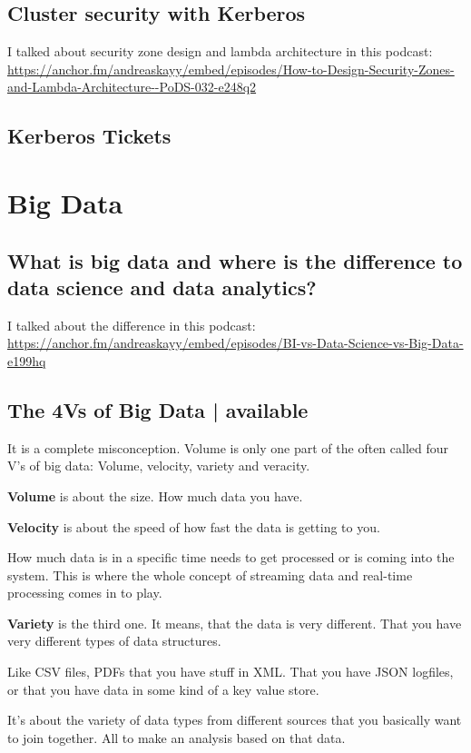 \documentclass[12pt, numbers=noenddot]{scrreprt} %
\begin{document}
\section{Cluster security with Kerberos}

I talked about security zone design and lambda architecture in this podcast: \url{https://anchor.fm/andreaskayy/embed/episodes/How-to-Design-Security-Zones-and-Lambda-Architecture--PoDS-032-e248q2}

\section{Kerberos Tickets}


\chapter{Big Data}
\section{What is big data and where is the difference to data science and data analytics?}
I talked about the difference in this podcast: \url{https://anchor.fm/andreaskayy/embed/episodes/BI-vs-Data-Science-vs-Big-Data-e199hq}

\section{The 4Vs of Big Data | available}

It is a complete misconception. Volume is only one part of the often called four V’s of big data: Volume, velocity, variety and veracity.

\textbf{Volume} is about the size. How much data you have.

\textbf{Velocity} is about the speed of how fast the data is getting to you.

How much data is in a specific time needs to get processed or is coming into the system. This is where the whole concept of streaming data and real-time processing comes in to play.

\textbf{Variety} is the third one. It means, that the data is very different. That you have very different types of data structures.

Like CSV files, PDFs that you have stuff in XML. That you have JSON logfiles, or that you have data in some kind of a key value store.

It’s about the variety of data types from different sources that you basically want to join together. All to make an analysis based on that data.
\end{document}
